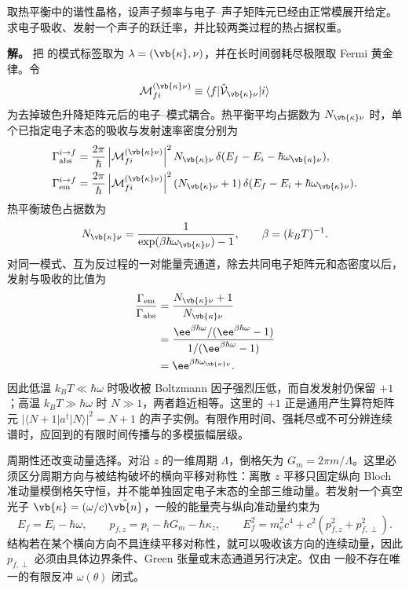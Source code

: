 \begin{exbox}[热声子吸收与发射]
取热平衡中的谐性晶格，设声子频率与电子--声子矩阵元已经由正常模展开给定。求电子吸收、发射一个声子的跃迁率，并比较两类过程的热占据权重。

\textbf{解。} 把 的模式标签取为 $\lambda=(\vb{\kappa},\nu)$，并在长时间弱耗尽极限取 Fermi 黄金律。令
\begin{equation*}
 \mathcal M_{fi}^{(\vb{\kappa}\nu)}
 \equiv\langle f|\hat{\mathcal V}_{\vb{\kappa}\nu}|i\rangle
\end{equation*}
为去掉玻色升降矩阵元后的电子--模式耦合。热平衡平均占据数为 $N_{\vb{\kappa}\nu}$ 时，单个已指定电子末态的吸收与发射速率密度分别为
\begin{align*}
\Gamma_{\rm abs}^{i\to f}
&=\frac{2\pi}{\hbar}
\left|\mathcal M_{fi}^{(\vb{\kappa}\nu)}\right|^2
N_{\vb{\kappa}\nu}\,
\delta(E_f-E_i-\hbar\omega_{\vb{\kappa}\nu}),\\
\Gamma_{\rm em}^{i\to f}
&=\frac{2\pi}{\hbar}
\left|\mathcal M_{fi}^{(\vb{\kappa}\nu)}\right|^2
(N_{\vb{\kappa}\nu}+1)\,
\delta(E_f-E_i+\hbar\omega_{\vb{\kappa}\nu}).
\end{align*}
热平衡玻色占据数为
\begin{equation*}
N_{\vb{\kappa}\nu}
=\frac{1}{\exp(\beta\hbar\omega_{\vb{\kappa}\nu})-1},
\qquad \beta=(k_BT)^{-1}.
\end{equation*}
对同一模式、互为反过程的一对能量壳通道，除去共同电子矩阵元和态密度以后，发射与吸收的比值为
\begin{align*}
\frac{\Gamma_{\rm em}}{\Gamma_{\rm abs}}
&=\frac{N_{\vb{\kappa}\nu}+1}{N_{\vb{\kappa}\nu}}\\
&=\frac{\ee^{\beta\hbar\omega}/(\ee^{\beta\hbar\omega}-1)}{1/(\ee^{\beta\hbar\omega}-1)}\\
&=\ee^{\beta\hbar\omega_{\vb{\kappa}\nu}}.
\end{align*}
因此低温 $k_BT\ll\hbar\omega$ 时吸收被 Boltzmann 因子强烈压低，而自发发射仍保留 $+1$；高温 $k_BT\gg\hbar\omega$ 时 $N\gg1$，两者趋近相等。这里的 $+1$ 正是通用产生算符矩阵元 $|\langle N+1|a^\dagger|N\rangle|^2=N+1$ 的声子实例。有限作用时间、强耗尽或不可分辨连续谱时，应回到的有限时间传播与的多模振幅层级。
\end{exbox}

周期性还改变动量选择。对沿 $z$ 的一维周期 $\Lambda$，倒格矢为 $G_m=2\pi m/\Lambda$。这里必须区分周期方向与被结构破坏的横向平移对称性：离散 $z$ 平移只固定纵向 Bloch 准动量模倒格矢守恒，并不能单独固定电子末态的全部三维动量。若发射一个真空光子
$\vb{\kappa}=(\omega/c)\hat{\vb{n}}$，一般的能量壳与纵向准动量约束为
\begin{equation}
{
E_f=E_i-\hbar\omega,
\qquad
p_{f,z}=p_i-\hbar G_m-\hbar\kappa_z,
\qquad
E_f^2=m_{\mathrm e}^2c^4+c^2\!\left(p_{f,z}^2+p_{f,\perp}^2\right).}
\label{eq:periodic_photon_exact_conservation}
\end{equation}
结构若在某个横向方向不具连续平移对称性，就可以吸收该方向的连续动量，因此 $p_{f,\perp}$ 必须由具体边界条件、Green 张量或末态通道另行决定。仅由 一般不存在唯一的有限反冲 $\omega(\theta)$ 闭式。

